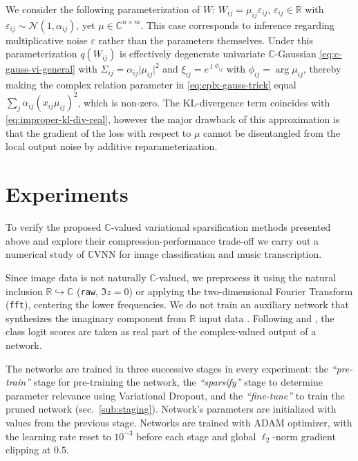 \documentclass[a4paper,10pt,twocolumn]{article}
\newcommand{\real}{\mathbb{R}}
\newcommand{\cplx}{\mathbb{C}}
\newcommand{\iu}{{\jmath}}
\begin{document}
We consider the following parameterization of $W$: $
  W_{ij} = \mu_{ij} \varepsilon_{ij}
$, $\varepsilon_{ij} \in \real$ with $
  \varepsilon_{ij} \sim \mathcal{N}(1, \alpha_{ij})
$, yet $\mu \in \cplx^{n \times m}$. This case corresponds to inference regarding
multiplicative noise $\varepsilon$ rather than the parameters themselves. Under
this parameterization $q(W_{ij})$ is effectively degenerate univariate $\cplx$-Gaussian
\eqref{eq:c-gauss-vi-general} with $
  \Sigma_{ij} = \alpha_{ij} \lvert \mu_{ij} \rvert^2
$ and $
  \xi_{ij} = e^{\iu \phi_{ij}}
$ with $\phi_{ij} = \arg \mu_{ij}$, thereby making the complex relation parameter
in \eqref{eq:cplx-gauss-trick} equal $
  \sum_j \alpha_{ij} (x_{ij} \mu_{ij})^2
$, which is non-zero.
%
The KL-divergence term coincides with \eqref{eq:improper-kl-div-real}, however the major
drawback of this approximation is that the gradient of the loss with respect to $\mu$ cannot
be disentangled from the local output noise by additive reparameterization.





\section{Experiments} %
\label{sec:experiments}

To verify the proposed $\cplx$-valued variational sparsification methods presented
above and explore their compression-performance trade-off we carry out a numerical
study of $\cplx$VNN for image classification and music transcription.

Since image data is not naturally $\cplx$-valued, we preprocess it using the natural
inclusion $\real \hookrightarrow \cplx$ (\texttt{raw}, $\Im z = 0$) or applying the
two-dimensional Fourier Transform (\texttt{fft}), centering the lower frequencies. We
do not train an auxiliary network that synthesizes the imaginary component from $\real$
input data \citep{trabelsi_deep_2018}.
%
Following \citet{wolter_complex_2018} and \citet{trabelsi_deep_2018}, the class logit
scores are taken as real part of the complex-valued output of a network.

The networks are trained in three successive stages in every experiment: the \emph{``pre-train''}
stage for pre-training the network, the \emph{``sparsify''} stage to determine parameter
relevance using Variational Dropout, and the \emph{``fine-tune''} to train the pruned
network (sec.~\ref{sub:staging}). Network's parameters are initialized with values from
the previous stage.
%
Networks are trained with ADAM optimizer, with the learning rate reset to $10^{-3}$ before
each stage and global $\ell_2$-norm gradient clipping at $0.5$.
\end{document}
